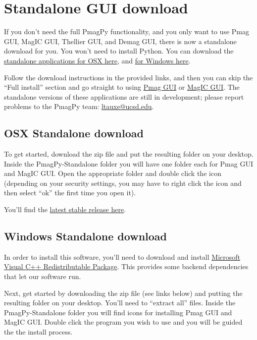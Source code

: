 \documentclass[11pt]{book}
\begin{document}
{
\section{Standalone GUI download}

If you don't need the full PmagPy functionality, and you only want to use Pmag GUI, MagIC GUI, Thellier GUI, and Demag GUI, there is now a standalone download for you.  You won't need to install Python.
You can download the \href{https://github.com/PmagPy/PmagPy-Standalone-OSX/releases/latest}{standalone applications for OSX here}, and \href{https://github.com/PmagPy/PmagPy-Standalone-Windows/releases/latest}{for Windows here}.

Follow the download instructions in the provided links, and then you can skip the ``Full install'' section and go straight to using \href{#pmag_gui.py}{Pmag GUI} or \href{#magic_gui.py}{MagIC GUI}.  The standalone versions of these applications are still in development; please report problems to the PmagPy team: \href{mailto:ltauxe@ucsd.edu}{ltauxe@ucsd.edu}.

\subsection{OSX Standalone download}

To get started, download the zip file and put the resulting folder on your desktop. Inside the PmagPy-Standalone folder you will have one folder each for Pmag GUI and MagIC GUI. Open the appropriate folder and double click the icon (depending on your security settings, you may have to right click the icon and then select ``ok'' the first time you open it).

You'll find the \href{https://github.com/PmagPy/PmagPy-Standalone-OSX/releases/latest}{latest stable release here}.


\subsection{Windows Standalone download}
In order to install this software, you’ll need to download and install \href{https://www.microsoft.com/en-us/download/details.aspx?id=29}{Microsoft Visual C++ Redistributable Package}. This provides some backend dependencies that let our software run.

Next, get started by downloading the zip file (see links below) and putting the resulting folder on your desktop. You'll need to ``extract all'' files. Inside the PmagPy-Standalone folder you will find icons for installing Pmag GUI and MagIC GUI. Double click the program you wish to use and you will be guided the the install process.

}
\end{document}
